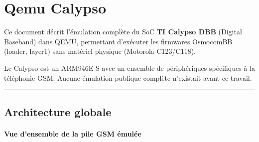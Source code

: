 \documentclass[
]{article}
\author{}
\date{\vspace{-2.5em}}
\begin{document}
\section{Qemu Calypso}\label{qemu-calypso}

Ce document décrit l'émulation complète du SoC \textbf{TI Calypso DBB}
(Digital Baseband) dans QEMU, permettant d'exécuter les firmwares
OsmocomBB (loader, layer1) sans matériel physique (Motorola C123/C118).

Le Calypso est un ARM946E-S avec un ensemble de périphériques
spécifiques à la téléphonie GSM. Aucune émulation publique complète
n'existait avant ce travail.

\begin{center}\rule{0.5\linewidth}{0.5pt}\end{center}

\subsection{Architecture globale}\label{architecture-globale}

\paragraph{Vue d'ensemble de la pile GSM
émulée}\label{vue-densemble-de-la-pile-gsm-uxe9muluxe9e}
\end{document}

